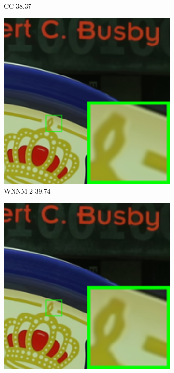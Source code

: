 \begin{figure}
\begin{subfigure}[t]{0.19\textwidth}
		\caption{CC 38.37}
    \end{subfigure}
    \hfill
    \begin{subfigure}[t]{0.19\textwidth}
        \centering
        \includegraphics[width=1\textwidth]{images/mcwnnm/cc/resize_br_WNNMJ_CC15_5dmark3_iso3200_1.png}
		\caption{WNNM-2 39.74}
    \end{subfigure}
    \hfill
    \begin{subfigure}[t]{0.19\textwidth}
        \centering
        \includegraphics[width=1\textwidth]{images/mcwnnm/cc/resize_br_WNNM_ADMM_NL_CC15_5dmark3_iso3200_1.png}

\end{subfigure}
\end{figure}
